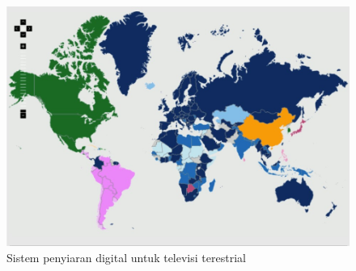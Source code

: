 \begin{figure}[H]
	\vspace{-0.1cm}
	\begin{center}
		\includegraphics[width=1\columnwidth]{bab2/Gambar/Sistem penyiaran digital untuk televisi terestrial.jpg}
	\end{center}
	\vspace{-0.2cm}
	\caption{Sistem penyiaran digital untuk televisi terestrial \citep{dtvstatus2017}}\label{Sistem penyiaran digital untuk televisi terestrial}
\end{figure}

